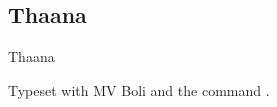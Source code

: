 \subsection{Thaana}

\newfontfamily{}

\begin{scriptexample}[]{Thaana}

\hfill Typeset with MV Boli and the command \cmd{\thaana}.
\end{scriptexample}